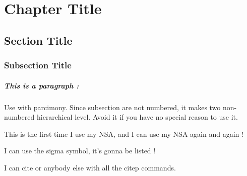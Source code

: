 \chapter{Chapter Title}
\label{chap:mychapter}
\section{Section Title}
\label{sec:mysection:mychapter}
\subsection{Subsection Title}
\label{subsec:mysbusection:mychapter}

\paragraph{This is a paragraph :} Use with parcimony. Since subsection are not numbered, it makes two non-numbered hierarchical level. Avoid it if you have no special reason to use it.

This is the first time I use my \gls{NSA}, and I can use my \gls{NSA} again and again !


I can use the \gls{sigma}  symbol, it's  gonna be listed !

I  can cite  \citep{Doe1992}  or  anybody  else with  all  the  citep  commands.